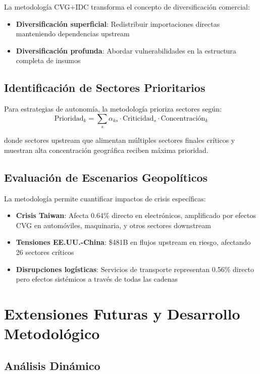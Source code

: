 \documentclass[12pt,a4paper]{article}
\begin{document}
La metodología CVG+IDC transforma el concepto de diversificación comercial:

\begin{itemize}
    \item \textbf{Diversificación superficial}: Redistribuir importaciones directas manteniendo dependencias upstream
    \item \textbf{Diversificación profunda}: Abordar vulnerabilidades en la estructura completa de insumos
\end{itemize}

\subsection{Identificación de Sectores Prioritarios}

Para estrategias de autonomía, la metodología prioriza sectores según:
\begin{equation}
\text{Prioridad}_k = \sum_{s} \alpha_{ks} \cdot \text{Criticidad}_s \cdot \text{Concentración}_k
\end{equation}

donde sectores upstream que alimentan múltiples sectores finales críticos y muestran alta concentración geográfica reciben máxima prioridad.

\subsection{Evaluación de Escenarios Geopolíticos}

La metodología permite cuantificar impactos de crisis específicas:
\begin{itemize}
    \item \textbf{Crisis Taiwan}: Afecta 0.64\% directo en electrónicos, amplificado por efectos CVG en automóviles, maquinaria, y otros sectores downstream
    \item \textbf{Tensiones EE.UU.-China}: \$481B en flujos upstream en riesgo, afectando 26 sectores críticos
    \item \textbf{Disrupciones logísticas}: Servicios de transporte representan 0.56\% directo pero efectos sistémicos a través de todas las cadenas
\end{itemize}

\section{Extensiones Futuras y Desarrollo Metodológico}

\subsection{Análisis Dinámico}
\end{document}
